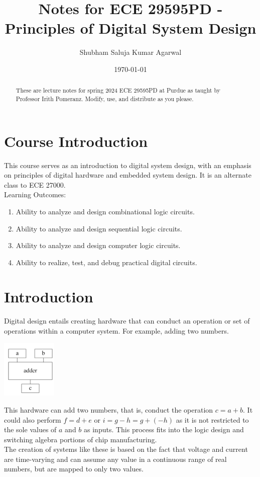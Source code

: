 \documentclass[nobib]{tufte-handout}
\title{Notes for ECE 29595PD - Principles of Digital System Design}
\author[Shubham Saluja Kumar Agarwal]{Shubham Saluja Kumar Agarwal}
\date{\today}  %
\begin{document}
\maketitle

\begin{abstract}
    These are lecture notes for spring 2024 ECE 29595PD at Purdue as taught by Professor Irith Pomeranz. Modify, use, and distribute as you please.
\end{abstract}

\tableofcontents

\section{Course Introduction}

This course serves as an introduction to digital system design, with an
emphasis on principles of digital hardware and embedded system design. It is an
alternate class to ECE 27000. \\ Learning Outcomes:
\begin{enumerate}
    \item Ability to analyze and design combinational logic circuits.
    \item Ability to analyze and design sequential logic circuits.
    \item Ability to analyze and design computer logic circuits.
    \item Ability to realize, test, and debug practical digital circuits.
\end{enumerate}

\pagebreak

\section{Introduction}

Digital design entails creating hardware that can conduct an operation or set
of operations within a computer system. For example, adding two numbers. \\
\begin{center}
    \includegraphics[width= 100px]{images/Screenshot 2024-01-08 151414.png}
\end{center}
This hardware can add two numbers, that is, conduct the operation $c=a+b$. It could also perform $f=d+e$ or $i=g-h=g+(-h)$ as it is not restricted to the sole values of $a$ and $b$ as inputs. This process fits into the logic design and switching algebra portions of chip manufacturing.\\
The creation of systems like these is based on the fact that voltage and current are time-varying and can assume any value in a continuous range of real numbers, but are mapped to only two values.
\end{document}
